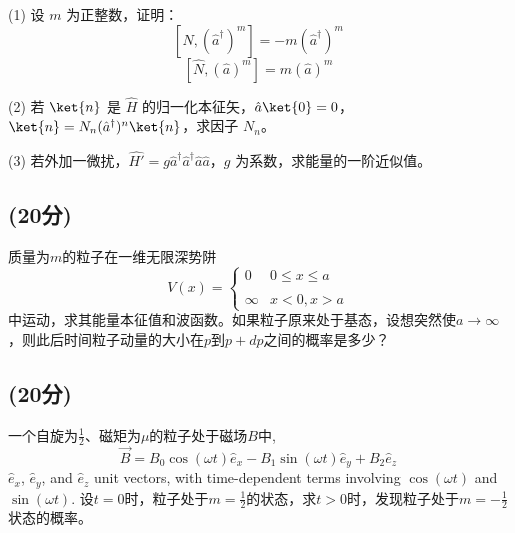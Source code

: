 (1) 设 $m$ 为正整数，证明：
$$[\hat{N}, (\hat{a}^\dagger)^m] = -m(\hat{a}^\dagger)^m~$$ 
$$[\hat{N}, (\hat{a})^m] = m(\hat{a})^m~$$

(2) 若 $\ket{n}$ 是 $\hat{H}$ 的归一化本征矢，$\hat{a}\ket{0} = 0$，$\ket{n} = N_n ( \hat{a}^\dagger )^n\ket{n}$，求因子 $N_n$。

(3) 若外加一微扰，$\hat{H'} = g\hat{a}^\dagger \hat{a}^\dagger \hat{a} \hat{a}$，$g$ 为系数，求能量的一阶近似值。
\subsection{(20分)}
 质量为$m$的粒子在一维无限深势阱
\[V(x) = \begin{cases} 0 & 0 \leq x \leq a \\\\\infty & x < 0, x > a \end{cases}~\]
中运动，求其能量本征值和波函数。如果粒子原来处于基态，设想突然使$a \to \infty$，则此后时间粒子动量的大小在$p$到$p + d p$之间的概率是多少？
\subsection{(20分)}
 一个自旋为$\frac{1}{2}$、磁矩为$\mu$的粒子处于磁场$B$中,
\[
\vec{B} = B_0 \cos(\omega t) \hat{e}_x - B_1 \sin(\omega t) \hat{e}_y + B_2 \hat{e}_z~
\]
 $\hat{e}_x$, $\hat{e}_y$, and $\hat{e}_z$ unit vectors, with time-dependent terms involving $\cos(\omega t)$ and $\sin(\omega t)$.
设$t = 0$时，粒子处于$m = \frac{1}{2}$的状态，求$t > 0$时，发现粒子处于$m= -\frac{1}{2}$状态的概率。